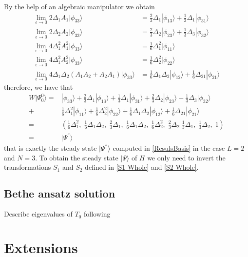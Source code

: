 \documentclass[10pt]{article}
\numberwithin{equation}{section}
\numberwithin{equation}{subsection}
\begin{document}
By the help of an algebraic manipulator we obtain 
\begin{align}
	\lim_{\epsilon\to 0}2\Delta_{1}A_{1}|\phi_{33}\rangle&=\frac{2}{3}\Delta_{1}|\phi_{13}\rangle+\frac{1}{3}\Delta_{1}|\phi_{31}\rangle\\
	\lim_{\epsilon\to 0}2\Delta_{2}A_{2}|\phi_{33}\rangle&=\frac{2}{3}\Delta_{2}|\phi_{23}\rangle+\frac{1}{3}\Delta_{3}|\phi_{32}\rangle\\
\lim_{\epsilon\to 0}	4\Delta_{1}^{2}A_{1}^{2}|\phi_{33}\rangle&=\frac{1}{6}\Delta_{1}^{2}|\phi_{11}\rangle\\
\lim_{\epsilon\to 0}	4\Delta_{1}^{2}A_{2}^{2}|\phi_{33}\rangle&=\frac{1}{6}\Delta_{2}^{2}|\phi_{22}\rangle\\
\lim_{\epsilon\to 0}	4\Delta_{1}\Delta_{2}\left(A_{1}A_{2}+A_{2}A_{1}\right)|\phi_{33}\rangle&=\frac{1}{6}\Delta_{1}\Delta_{2}|\phi_{12}\rangle+\frac{1}{6}\Delta_{21}|\phi_{21}\rangle
\end{align}
therefore, we have that
\begin{equation}
	\begin{split}
	W|\Psi_{0}^{0}\rangle=&|\phi_{33}\rangle+\frac{2}{3}\Delta_{1}|\phi_{13}\rangle+\frac{1}{3}\Delta_{1}|\phi_{31}\rangle+\frac{2}{3}\Delta_{2}|\phi_{23}\rangle+\frac{1}{3}\Delta_{3}|\phi_{32}\rangle\\+&\frac{1}{6}\Delta_{1}^{2}|\phi_{11}\rangle+\frac{1}{6}\Delta_{2}^{2}|\phi_{22}\rangle+\frac{1}{6}\Delta_{1}\Delta_{2}|\phi_{12}\rangle+\frac{1}{6}\Delta_{21}|\phi_{21}\rangle
	\\=& \left(\frac{1}{6}\Delta_{1}^{2},\;\frac{1}{6}\Delta_{1}\Delta_{2},\;\frac{2}{3}\Delta_{1},\;\frac{1}{6}\Delta_{1}\Delta_{2},\;\frac{1}{6}\Delta_{2}^{2},\;\frac{2}{3}\Delta_{2}\;\frac{1}{3}\Delta_{1},\;\frac{1}{3}\Delta_{2},\;1\right)\\=& |\Psi^{''}\rangle
	\end{split}
\end{equation}
that is exactly the steady state $|\Psi^{''}\rangle$ computed in \eqref{ResulsBasis} in the case $L=2$ and $N=3$. To obtain the steady state $|\Psi\rangle$ of $H$ we only need to invert the transformations $S_{1}$ and $S_{2}$ defined in \eqref{S1-Whole} and \eqref{S2-Whole}. 
\subsection{Bethe ansatz solution}

Describe eigenvalues of $T_0$ following 
\cite{Belliard2} 
\section{Extensions}
\end{document}
